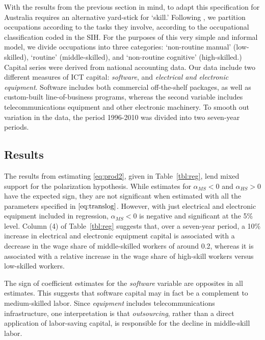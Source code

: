 With the results from the previous section in mind, to adapt this specification for Australia requires an alternative yard-stick for `skill.' Following \citet{Levy2003}, we partition occupations according to the tasks they involve, according to the occupational classification coded in the SIH. For the purposes of this very simple and informal model, we divide occupations into three categories: `non-routine manual' (low-skilled), `routine' (middle-skilled), and `non-routine cognitive' (high-skilled.) Capital series were derived from national accounting data. Our data include two different measures of ICT capital: {\em software}, and {\em electrical and electronic equipment}. Software includes both commercial off-the-shelf packages, as well as custom-built line-of-business programs, whereas the second variable includes telecommunications equipment and other electronic machinery. To smooth out variation in the data, the  period 1996-2010 was divided into two seven-year periods.

\subsection{Results}

The results from estimating \eqref{eq:prod2}, given in Table~\ref{tbl:reg}, lend mixed support for the polarization hypothesis. While estimates for $\alpha_{MS}<0$ and $\alpha_{HS}>0$ have the expected sign, they are not significant when estimated with all the parameters specified in $\eqref{eq:translog}$. However, with just electrical and electronic equipment included in regression, $\alpha_{MS}<0$ is negative and significant at the 5\% level. Column (4) of Table~\ref{tbl:reg} suggests that, over a seven-year period, a 10\% increase in electrical and electronic equipment capital is associated with a decrease in the wage share of middle-skilled workers of around 0.2, whereas it is associated with a relative increase in the wage share of high-skill workers versus low-skilled workers.

The sign of coefficient estimates for the {\em software} variable are opposites in all estimates. This suggests that software capital may in fact be a complement to medium-skilled labor. Since {\em equipment} includes telecommunications infrastructure, one interpretation is that {\em outsourcing}, rather than a direct application of labor-saving capital, is responsible for the decline in middle-skill labor.

